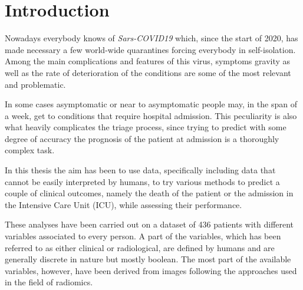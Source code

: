 \chapter{Introduction}
\vspace*{0.5cm}
\setcounter{page}{1}


Nowadays everybody knows of  \textit{Sars-COVID19} which, since the start of 2020, has made necessary a few world-wide quarantines forcing everybody in self-isolation.
Among the main complications and features of this virus, symptoms gravity as well as the rate of deterioration of the conditions are some of the most relevant and problematic.

In some cases asymptomatic or near to asymptomatic people may, in the span of a week, get to conditions that require hospital admission.
This peculiarity is also what heavily complicates the triage process, since trying to predict with some degree of accuracy the prognosis of the patient at admission is a thoroughly complex task.

In this thesis the aim has been to use data, specifically including data that cannot be easily interpreted by humans, to try various methods to predict a couple of clinical outcomes, namely the death of the patient or the admission in the Intensive Care Unit (ICU), while assessing their performance.

These analyses have been carried out on a dataset of 436 patients with different variables associated to every person.
A part of the variables, which has been referred to as either clinical or radiological, are defined by humans and are generally discrete in nature but mostly boolean.
The most part of the available variables, however, have been derived from images following the approaches used in the field of radiomics.

